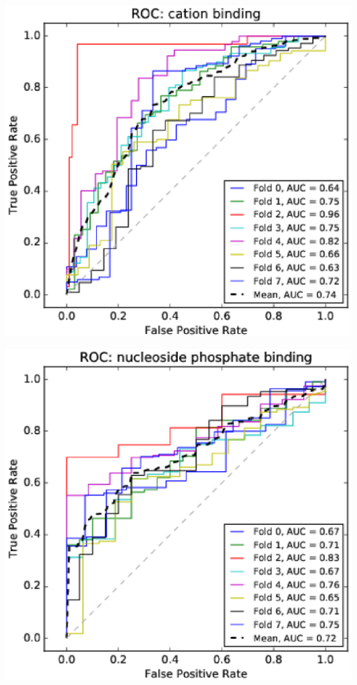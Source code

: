 \documentclass[11pt,twoside,a4paper]{book}
\newenvironment{Figure}
  {\par\medskip\noindent\minipage{\linewidth}}
  {\endminipage\par\medskip}
\begin{document}
\begin{multicols}{2}
\begin{Figure}\begin{center}\includegraphics[width=\linewidth]{figures/roc_cation_binding}\label{fig:roc_cation_binding}\end{center}\end{Figure}
\begin{Figure}\begin{center}\includegraphics[width=\linewidth]{figures/roc_nucleoside_phosphate_binding}\label{fig:roc_nucleoside_phosphate_binding}\end{center}\end{Figure}

\end{multicols}
\end{document}
